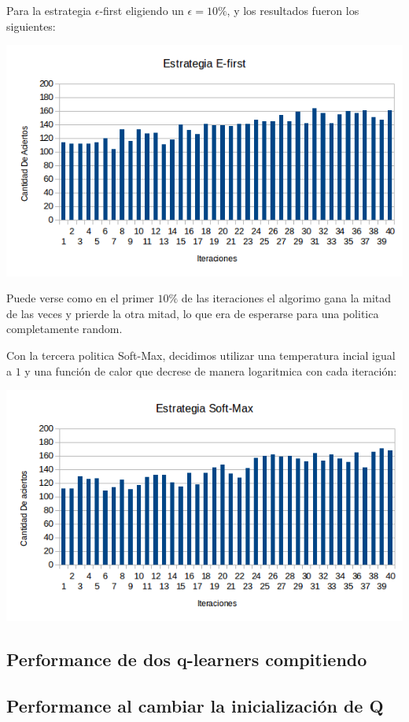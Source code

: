 
Para la estrategia $\epsilon$-first eligiendo un $\epsilon=10\%$, y los resultados fueron los siguientes:

\includegraphics[scale=0.5]{testing/ef.png}

Puede verse como en el primer $10\%$ de las iteraciones el algorimo gana la mitad de las veces y prierde la otra mitad, lo que era de esperarse para una politica completamente random.

Con la tercera politica Soft-Max, decidimos utilizar una temperatura incial igual a $1$ y una función de calor que decrese de manera logaritmica con cada iteración:

\includegraphics[scale=0.5]{testing/softmax.png}


\subsection{Performance de dos q-learners compitiendo}



\subsection{Performance al cambiar la inicialización de Q}
